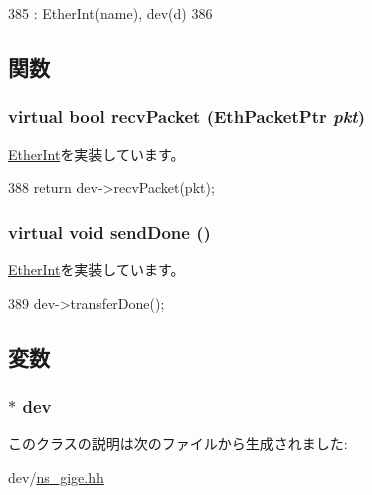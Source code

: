 \begin{DoxyCode}
385         : EtherInt(name), dev(d)
386     { }
\end{DoxyCode}


\subsection{関数}
\hypertarget{classNSGigEInt_a9bd96a108d6f58f140c9f7d83726eebe}{
\subsubsection[{recvPacket}]{\setlength{\rightskip}{0pt plus 5cm}virtual bool recvPacket ({\bf EthPacketPtr} {\em pkt})}}
\label{classNSGigEInt_a9bd96a108d6f58f140c9f7d83726eebe}


\hyperlink{classEtherInt_af3076ea966a2abda7735ea65e8a02034}{EtherInt}を実装しています。


\begin{DoxyCode}
388 { return dev->recvPacket(pkt); }
\end{DoxyCode}
\hypertarget{classNSGigEInt_a967489e0b2900f4b12d99e6257d24dbe}{
\subsubsection[{sendDone}]{\setlength{\rightskip}{0pt plus 5cm}virtual void sendDone ()}}
\label{classNSGigEInt_a967489e0b2900f4b12d99e6257d24dbe}


\hyperlink{classEtherInt_a5a2f0c04ee61250a128bc992d2118390}{EtherInt}を実装しています。


\begin{DoxyCode}
389 { dev->transferDone(); }
\end{DoxyCode}


\subsection{変数}
\hypertarget{classNSGigEInt_a04e0517c9b37f7d4c6b3d16d5521c536}{
\subsubsection[{dev}]{$\ast$ {\bf dev}}}
\label{classNSGigEInt_a04e0517c9b37f7d4c6b3d16d5521c536}


このクラスの説明は次のファイルから生成されました:\begin{DoxyCompactItemize}
\item 
dev/\hyperlink{ns__gige_8hh}{ns\_\-gige.hh}\end{DoxyCompactItemize}
